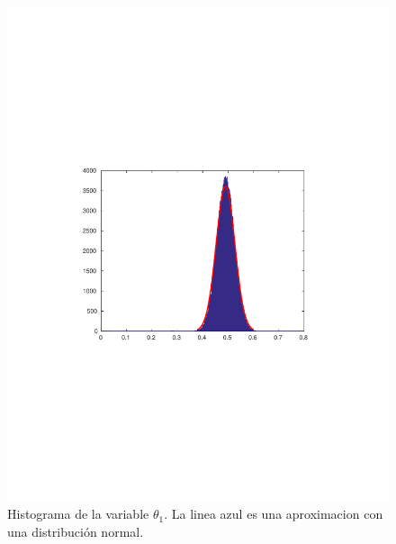 \begin{figure}[H]
\begin{minipage}{0.5\textwidth}
	\includegraphics[width=1.2\textwidth]{imgs/theta1.pdf}
	\caption{\footnotesize Histograma de la variable $\theta_1$. La linea azul es una aproximacion con una distribución normal.}
\end{minipage}
\end{figure}


